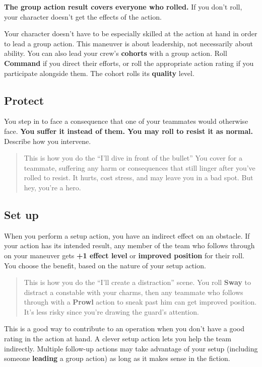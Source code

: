 \documentclass[11pt,oneside]{book}
\newcommand{\gameterm}[1]{\textbf{#1}}
\begin{document}
\textbf{The group action result covers everyone who rolled.} If you don’t roll, your character doesn’t get the effects of the action.

Your character doesn’t have to be especially skilled at the action at hand in order to lead a group action. This maneuver is about leadership, not necessarily about ability. You can also lead your crew’s \textbf{cohorts} with a group action. Roll \gameterm{Command}  if you direct their efforts, or roll the appropriate action rating if you participate alongside them. The cohort rolls its \textbf{quality} level.

\subsection{Protect}

You step in to face a consequence that one of your teammates would otherwise face. \textbf{You suffer it instead of them. You may roll to resist it as normal.} Describe how you intervene.

\begin{quote}
	This is how you do the “I’ll dive in front of the bullet” You cover for a teammate, suffering any harm or consequences that still linger after you’ve rolled to resist. It hurts, cost stress, and may leave you in a bad spot. But hey, you’re a hero.
\end{quote} 

\subsection{Set up}

When you perform a setup action, you have an indirect effect on an obstacle. If your action has its intended result, any member of the team who follows through on your maneuver gets \textbf{+1 effect level} or \textbf{improved position} for their roll. You choose the benefit, based on the nature of your setup action.

\begin{quote}
	This is how you do the “I’ll create a distraction” scene. You roll \gameterm{Sway}  to distract a constable with your charms, then any teammate who follows through with a \gameterm{Prowl}  action to sneak past him can get improved position. It’s less risky since you’re drawing the guard’s attention.
\end{quote} 

This is a good way to contribute to an operation when you don’t have a good rating in the action at hand. A clever setup action lets you help the team indirectly. Multiple follow-up actions may take advantage of your setup (including someone \textbf{leading} a group action) as long as it makes sense in the fiction.
\end{document}
